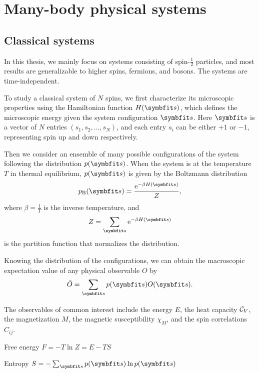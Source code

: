 \chapter{Many-body physical systems}


\section{Classical systems}
\label{sec:cl-sys}

In this thesis, we mainly focus on systems consisting of spin-$\frac{1}{2}$ particles, and most results are generalizable to higher spins, fermions, and bosons. The systems are time-independent.

To study a classical system of $N$ spins, we first characterize its microscopic properties using the Hamiltonian function $H(\vs)$, which defines the microscopic energy given the system configuration $\vs$. Here $\vs$ is a vector of $N$ entries $(s_1, s_2, \ldots, s_N)$, and each entry $s_i$ can be either $+1$ or $-1$, representing spin up and down respectively.

Then we consider an ensemble of many possible configurations of the system following the distribution $p(\vs)$. When the system is at the temperature $T$ in thermal equilibrium, $p(\vs)$ is given by the Boltzmann distribution
\begin{equation}
p_\text{B}(\vs) = \frac{\rme^{-\beta H(\vs)}}{Z},
\label{eq:boltzmann}
\end{equation}
where $\beta = \frac{1}{T}$ is the inverse temperature, and
\begin{equation}
Z = \sum_\vs \rme^{-\beta H(\vs)}
\end{equation}
is the partition function that normalizes the distribution.

Knowing the distribution of the configurations, we can obtain the macroscopic expectation value of any physical observable $O$ by
\begin{equation}
\bar{O} = \sum_\vs p(\vs) O(\vs).
\label{eq:cl-obs}
\end{equation}

The observables of common interest include the energy $E$, the heat capacity $\mathcal{C}_V$, the magnetization $M$, the magnetic susceptibility $\chi_M$, and the spin correlations $C_{i j}$.

Free energy $F = -T \ln Z = E - T S$

Entropy $S = -\sum_\vs p(\vs) \ln p(\vs)$

